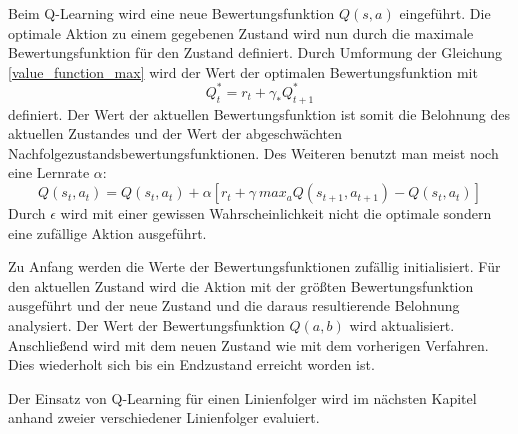 Beim Q-Learning wird eine neue Bewertungsfunktion $Q(s, a)$ eingeführt. Die optimale Aktion zu einem gegebenen Zustand wird nun durch die maximale Bewertungsfunktion für den Zustand definiert. Durch Umformung der Gleichung \ref{value_function_max} wird der Wert der optimalen Bewertungsfunktion mit
\begin{equation}
	Q^{*}_t = r_t + \gamma_*Q^{*}_{t+1}
\end{equation} 
definiert. Der Wert der aktuellen Bewertungsfunktion ist somit die Belohnung des aktuellen Zustandes und der Wert der abgeschwächten Nachfolgezustandsbewertungsfunktionen. Des Weiteren benutzt man meist noch eine Lernrate $\alpha$:
\begin{equation}
	Q(s_t, a_t) = Q(s_t, a_t) + \alpha[r_t + \gamma \ max_a Q(s_{t+1}, a_{t+1}) - Q(s_t, a_t)]
\end{equation}
Durch $\epsilon$ wird mit einer gewissen Wahrscheinlichkeit nicht die optimale sondern eine zufällige Aktion ausgeführt. \cite{Ertel_2013}\par
Zu Anfang werden die Werte der Bewertungsfunktionen zufällig initialisiert. Für den aktuellen Zustand wird die Aktion mit der größten Bewertungsfunktion ausgeführt und der neue Zustand und die daraus resultierende Belohnung analysiert. Der Wert der Bewertungsfunktion $Q(a, b)$ wird aktualisiert. Anschließend wird mit dem neuen Zustand wie mit dem vorherigen Verfahren. Dies wiederholt sich bis ein Endzustand erreicht worden ist. \cite{Ertel_2013}\par
Der Einsatz von Q-Learning für einen Linienfolger wird im nächsten Kapitel anhand zweier verschiedener Linienfolger evaluiert.
